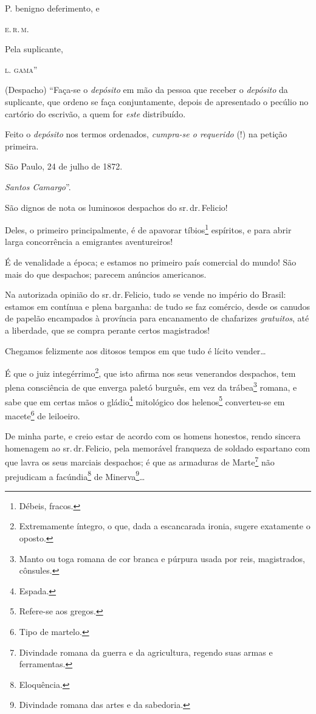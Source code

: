 \begin{flushright}
P. benigno deferimento, e

\textsc{e.\,r.\,m.}

Pela suplicante,

\textsc{l. gama}''
\end{flushright}

(Despacho) ``Faça-se o \emph{depósito} em mão da pessoa que receber o
\emph{depósito} da suplicante, que ordeno se faça conjuntamente, depois
de apresentado o pecúlio no cartório do escrivão, a quem for \emph{este}
distribuído.

Feito o \emph{depósito} nos termos ordenados, \emph{cumpra-se o
requerido} (!) na petição primeira.

São Paulo, 24 de julho de 1872.

\emph{Santos Camargo}''.

São dignos de nota os luminosos despachos do sr.\,dr.\,Felicio!

Deles, o primeiro principalmente, é de apavorar tíbios\footnote{
  Débeis, fracos.} espíritos, e para abrir larga concorrência a
emigrantes aventureiros!

É de venalidade a época; e estamos no primeiro país comercial do mundo!
São mais do que despachos; parecem anúncios americanos.

Na autorizada opinião do sr.\,dr.\,Felicio, tudo se vende no império do
Brasil: estamos em contínua e plena barganha: de tudo se faz comércio,
desde os canudos de papelão encampados à província para encanamento de
chafarizes \emph{gratuitos}, até a liberdade, que se compra perante
certos magistrados!

Chegamos felizmente aos ditosos tempos em que tudo é lícito vender\ldots{}

É que o juiz integérrimo\footnote{ Extremamente íntegro, o que, dada a
  escancarada ironia, sugere exatamente o oposto.}, que isto afirma nos
seus venerandos despachos, tem plena consciência de que enverga paletó
burguês, em vez da trábea\footnote{ Manto ou toga romana de cor branca
  e púrpura usada por reis, magistrados, cônsules.} romana, e sabe que
em certas mãos o gládio\footnote{ Espada.} mitológico dos
helenos\footnote{ Refere-se aos gregos.} converteu-se em
macete\footnote{ Tipo de martelo.} de leiloeiro.

De minha parte, e creio estar de acordo com os homens honestos, rendo
sincera homenagem ao sr.\,dr.\,Felicio, pela memorável franqueza de
soldado espartano com que lavra os seus marciais despachos; é que as
armaduras de Marte\footnote{ Divindade romana da guerra e da
  agricultura, regendo suas armas e ferramentas.} não prejudicam a
facúndia\footnote{ Eloquência.} de Minerva\footnote{ Divindade romana
  das artes e da sabedoria.}\ldots{}

